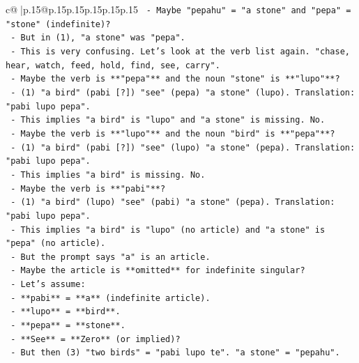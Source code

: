 \documentclass{article}
\begin{document}
{\begin{supertabular}{c@{$\;$}|p{.15\linewidth}@{}p{.15\linewidth}p{.15\linewidth}p{.15\linewidth}p{.15\linewidth}p{.15\linewidth}}
{{{\texttt{                  {-} Maybe "pepahu" = "a stone" and "pepa" = "stone" (indefinite)?} \\
\texttt{                  {-} But in (1), "a stone" was "pepa".} \\
\texttt{                  {-} This is very confusing. Let's look at the verb list again. "chase, hear, watch, feed, hold, find, see, carry".} \\
\texttt{                  {-} Maybe the verb is **"pepa"** and the noun "stone" is **"lupo"**?} \\
\texttt{                    {-} (1) "a bird" (pabi {[}?{]}) "see" (pepa) "a stone" (lupo). Translation: "pabi lupo pepa".} \\
\texttt{                    {-} This implies "a bird" is "lupo" and "a stone" is missing. No.} \\
\texttt{                  {-} Maybe the verb is **"lupo"** and the noun "bird" is **"pepa"**?} \\
\texttt{                    {-} (1) "a bird" (pabi {[}?{]}) "see" (lupo) "a stone" (pepa). Translation: "pabi lupo pepa".} \\
\texttt{                    {-} This implies "a bird" is missing. No.} \\
\texttt{                  {-} Maybe the verb is **"pabi"**?} \\
\texttt{                    {-} (1) "a bird" (lupo) "see" (pabi) "a stone" (pepa). Translation: "pabi lupo pepa".} \\
\texttt{                    {-} This implies "a bird" is "lupo" (no article) and "a stone" is "pepa" (no article).} \\
\texttt{                    {-} But the prompt says "a" is an article.} \\
\texttt{                    {-} Maybe the article is **omitted** for indefinite singular?} \\
\texttt{                    {-} Let's assume:} \\
\texttt{                      {-} **pabi** = **a** (indefinite article).} \\
\texttt{                      {-} **lupo** = **bird**.} \\
\texttt{                      {-} **pepa** = **stone**.} \\
\texttt{                      {-} **See** = **Zero** (or implied)?} \\
\texttt{                      {-} But then (3) "two birds" = "pabi lupo te". "a stone" = "pepahu".} \\
}}}
\end{supertabular}}
\end{document}
